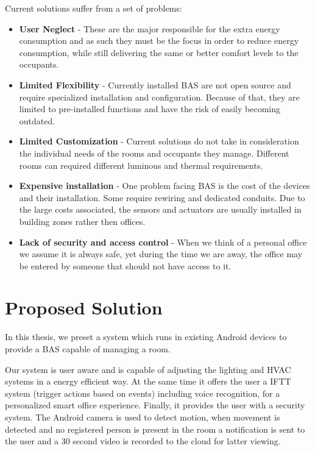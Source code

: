 Current solutions suffer from a set of problems:
\begin{itemize}
\item \textbf{User Neglect} - These are the major responsible for the extra energy consumption and as such they must be the focus in order to reduce energy consumption, while still delivering the same or better comfort levels to the occupants.
\item \textbf{Limited Flexibility} - Currently installed BAS are not open source and require specialized installation and configuration. Because of that, they are limited to pre-installed functions and have the risk of easily becoming outdated.
\item \textbf{Limited Customization} - Current solutions do not take in consideration the individual needs of the rooms and occupants they manage. Different rooms can required different luminous and thermal requirements. 
\item \textbf{Expensive installation} - One problem facing BAS is the cost of the devices and their installation. Some require rewiring  and dedicated conduits. Due to the large costs associated, the sensors and actuators are usually installed in building zones rather then offices.
\item \textbf{Lack of security and access control} - When we think of a personal office we assume it is always safe, yet during the time we are away, the office may be entered by someone that should not have access to it.  
\end{itemize}



\section{Proposed Solution}
\label{section:proposed}


In this thesis, we preset a system which runs in existing Android devices to provide a \ac{BAS} capable of managing a room. 

Our system is user aware and is capable of adjusting the lighting and \ac{HVAC} systems in a energy efficient way. At the same time it offers the user a \ac{IFTT} system (trigger actions based on events) including voice recognition, for a personalized smart office experience. Finally, it provides the user with a security system. The Android camera is used to detect motion, when movement is detected and no registered person is present in the room a notification is sent to the user and a 30 second video is recorded to the cloud for latter viewing.


